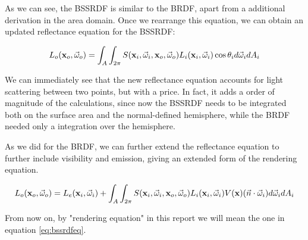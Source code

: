 As we can see, the BSSRDF is similar to the BRDF, apart from a additional derivation in the area domain. Once we rearrange this equation, we can obtain an updated reflectance equation for the BSSRDF:

$$
L_o(\mathbf{x}_o,\vec{\omega}_o) = \int_A \int_{2\pi} S(\mathbf{x}_i, \vec{\omega}_i, \mathbf{x}_o, \vec{\omega}_o) L_i(\mathbf{x}_i,\vec{\omega}_i) \cos \theta_i d\vec{\omega}_i d A_i
$$

We can immediately see that the new reflectance equation accounts for light scattering between two points, but with a price. In fact, it adds a order of magnitude of the calculations, since now the BSSRDF needs to be integrated both on the surface area and the normal-defined hemisphere, while the BRDF needed only a integration over the hemisphere. 

As we did for the BRDF, we can further extend the reflectance equation to further include visibility and emission, giving an extended form of the rendering equation. 

\begin{equation}
L_o(\mathbf{x}_o,\vec{\omega}_o) = L_e(\mathbf{x}_i,\vec{\omega}_i) + \int_A \int_{2\pi} S(\mathbf{x}_i, \vec{\omega}_i, \mathbf{x}_o, \vec{\omega}_o) L_i(\mathbf{x}_i,\vec{\omega}_i) V(\mathbf{x}) (\vec{n} \cdot \vec{\omega}_i) d\vec{\omega}_i d A_i
\label{eq:bssrdfeq}
\end{equation}

From now on, by "rendering equation" in this report we will mean the one in equation \ref{eq:bssrdfeq}. 

